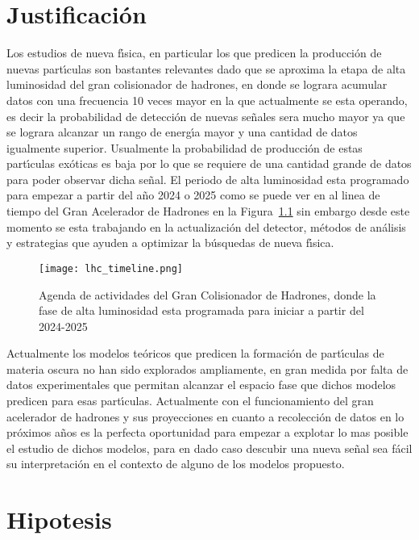 \chapter{Justificaci\'on}

Los estudios de nueva f\'{\i}sica, en particular los que predicen la producci\'on de nuevas part\'{\i}culas son bastantes relevantes dado que se aproxima la etapa de alta luminosidad del gran colisionador de hadrones, en donde se lograra acumular datos con una frecuencia 10 veces mayor en la que actualmente se esta operando, es decir la probabilidad de detecci\'on de nuevas se\~nales sera mucho mayor ya que se lograra alcanzar un rango de energ\'{\i}a mayor y una cantidad de datos igualmente superior. Usualmente la probabilidad de producci\'on de estas part\'{\i}culas ex\'oticas es baja por lo que se requiere de una cantidad grande de datos para poder observar dicha se\~nal. El periodo de alta luminosidad esta programado para empezar a partir del a\~no 2024 o 2025 como se puede ver en al linea de tiempo del Gran Acelerador de Hadrones en la Figura~\ref{fig:lhctimeline} sin embargo desde este momento se esta trabajando en la actualizaci\'on del detector, m\'etodos de an\'alisis y estrategias que ayuden a optimizar la b\'usquedas de nueva f\'{\i}sica. 

\begin{figure}
\begin{center}
  \texttt{[image: lhc\_timeline.png]}
  \caption{Agenda de actividades del Gran Colisionador de Hadrones, donde la fase de alta luminosidad esta programada para iniciar a partir del 2024-2025}
  \label{fig:lhctimeline}
\end{center}
\end{figure}


Actualmente los modelos te\'oricos que predicen la formaci\'on de part\'{\i}culas de materia oscura no han sido explorados ampliamente, en gran medida por falta de datos experimentales que permitan alcanzar el espacio fase que dichos modelos predicen para esas part\'{\i}culas.  Actualmente con el funcionamiento del gran acelerador de hadrones y sus proyecciones en cuanto a recolecci\'on de datos en lo pr\'oximos a\~nos es la perfecta oportunidad para empezar a explotar lo mas posible el estudio de dichos modelos, para en dado caso descubir una nueva se\~nal sea f\'acil su interpretaci\'on en el contexto de alguno de los modelos propuesto.


\chapter{Hipotesis}

